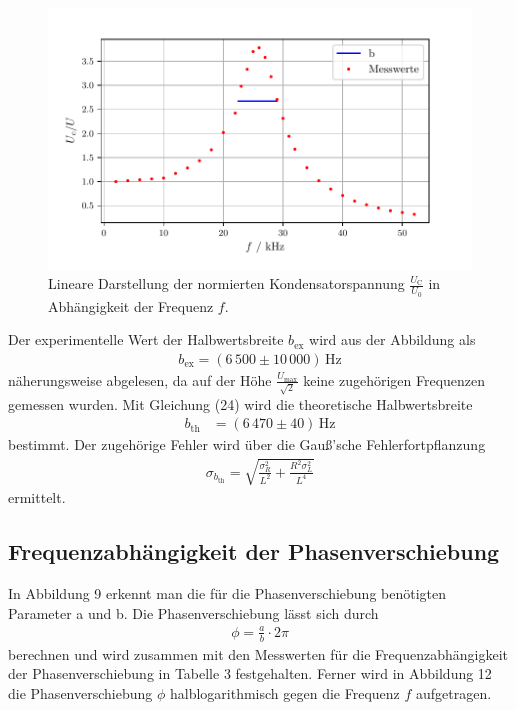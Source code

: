\begin{figure}[H]
  \centering
  \includegraphics{plotc.pdf}
  \caption{Lineare Darstellung der normierten Kondensatorspannung $\frac{U_\text{C}}{U_\text{0}}$ in Abhängigkeit der Frequenz $f$.}
  \label{fig:Plot c}
\end{figure}

Der experimentelle Wert der Halbwertsbreite $b_\text{ex}$ wird aus der Abbildung als
\begin{align*}
b_\text{ex} = (6\,500 \pm 10\,000)\,\si{\hertz}
\end{align*}
näherungsweise abgelesen, da auf der Höhe $\frac{U_\text{max}}{\sqrt{2}}$ keine zugehörigen Frequenzen gemessen wurden. Mit Gleichung (24) wird die theoretische Halbwertsbreite 
\begin{align*}
b_\text{th} &= (6\,470 \pm 40)\,\si{\hertz}
\end{align*}
bestimmt. Der zugehörige Fehler wird über die Gauß'sche Fehlerfortpflanzung 
\begin{align*}
\sigma_{b_\text{th}} = \sqrt{\frac{\sigma_{R}^{2}}{ L^{2}} + \frac{R^{2} \sigma_{L}^{2}}{L^{4}}}
\end{align*}
ermittelt.


\subsection{Frequenzabhängigkeit der Phasenverschiebung}
In Abbildung 9 erkennt man die für die Phasenverschiebung benötigten Parameter a und b. Die Phasenverschiebung lässt sich durch
\begin{align*}
\phi = \frac{a}{b} \cdot 2\pi
\end{align*}
berechnen und wird zusammen mit den Messwerten für die Frequenzabhängigkeit der Phasenverschiebung in Tabelle 3 festgehalten.
Ferner wird in Abbildung 12 die Phasenverschiebung $\phi$ halblogarithmisch gegen die Frequenz $f$ aufgetragen.



